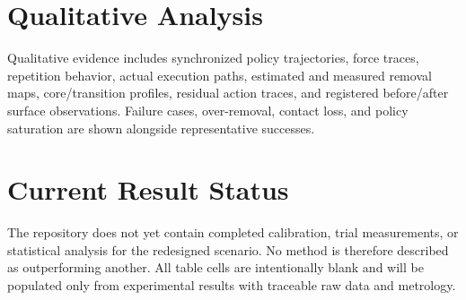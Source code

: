 \section{Qualitative Analysis}
Qualitative evidence includes synchronized policy trajectories, force traces, repetition behavior, actual execution paths, estimated and measured removal maps, core/transition profiles, residual action traces, and registered before/after surface observations. Failure cases, over-removal, contact loss, and policy saturation are shown alongside representative successes.

\section{Current Result Status}
The repository does not yet contain completed calibration, trial measurements, or statistical analysis for the redesigned scenario. No method is therefore described as outperforming another. All table cells are intentionally blank and will be populated only from experimental results with traceable raw data and metrology.
